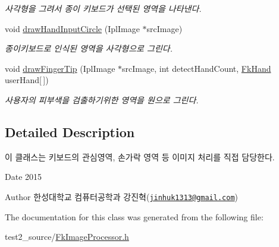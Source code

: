 \begin{DoxyCompactItemize}
\begin{DoxyCompactList}\small\item\em 사각형을 그려서 종이 키보드가 선택된 영역을 나타낸다. \end{DoxyCompactList}\item 
\hypertarget{class_fk_image_processor_a10e7819c2f0e92779008d247e276bfcf}{}void \hyperlink{class_fk_image_processor_a10e7819c2f0e92779008d247e276bfcf}{draw\+Hand\+Input\+Circle} (Ipl\+Image $\ast$src\+Image)\label{class_fk_image_processor_a10e7819c2f0e92779008d247e276bfcf}

\begin{DoxyCompactList}\small\item\em 종이키보드로 인식된 영역을 사각형으로 그린다. \end{DoxyCompactList}\item 
\hypertarget{class_fk_image_processor_a1c94e5daa8ba8325743f98c4b57ce64c}{}void \hyperlink{class_fk_image_processor_a1c94e5daa8ba8325743f98c4b57ce64c}{draw\+Finger\+Tip} (Ipl\+Image $\ast$src\+Image, int detect\+Hand\+Count, \hyperlink{class_fk_hand}{Fk\+Hand} user\+Hand\mbox{[}$\,$\mbox{]})\label{class_fk_image_processor_a1c94e5daa8ba8325743f98c4b57ce64c}

\begin{DoxyCompactList}\small\item\em 사용자의 피부색을 검출하기위한 영역을 원으로 그린다. \end{DoxyCompactList}\end{DoxyCompactItemize}


\subsection{Detailed Description}
이 클래스는 키보드의 관심영역, 손가락 영역 등 이미지 처리를 직접 담당한다. 

\begin{DoxyDate}{Date}
2015 
\end{DoxyDate}
\begin{DoxyAuthor}{Author}
한성대학교 컴퓨터공학과 강진혁(\href{mailto:jinhuk1313@gmail.com}{\tt jinhuk1313@gmail.\+com}) 
\end{DoxyAuthor}


The documentation for this class was generated from the following file\+:\begin{DoxyCompactItemize}
\item 
test2\+\_\+source/\hyperlink{_fk_image_processor_8h}{Fk\+Image\+Processor.\+h}\end{DoxyCompactItemize}
